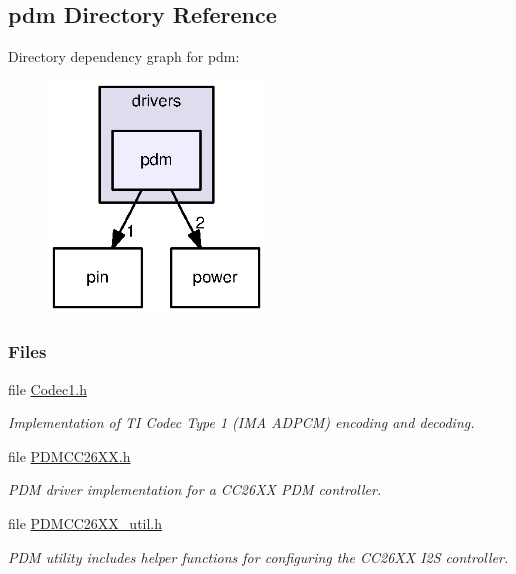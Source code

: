 \subsection{pdm Directory Reference}
\label{dir_bca3aac4d77a93238384b1b0950b79d9}
Directory dependency graph for pdm\+:
\nopagebreak
\begin{figure}[H]
\begin{center}
\leavevmode
\includegraphics[width=163pt]{dir_bca3aac4d77a93238384b1b0950b79d9_dep}
\end{center}
\end{figure}
\subsubsection*{Files}
\begin{DoxyCompactItemize}
\item 
file \hyperlink{_codec1_8h}{Codec1.\+h}
\begin{DoxyCompactList}\small\item\em Implementation of T\+I Codec Type 1 (I\+M\+A A\+D\+P\+C\+M) encoding and decoding. \end{DoxyCompactList}\item 
file \hyperlink{_p_d_m_c_c26_x_x_8h}{P\+D\+M\+C\+C26\+X\+X.\+h}
\begin{DoxyCompactList}\small\item\em P\+D\+M driver implementation for a C\+C26\+X\+X P\+D\+M controller. \end{DoxyCompactList}\item 
file \hyperlink{_p_d_m_c_c26_x_x__util_8h}{P\+D\+M\+C\+C26\+X\+X\+\_\+util.\+h}
\begin{DoxyCompactList}\small\item\em P\+D\+M utility includes helper functions for configuring the C\+C26\+X\+X I2\+S controller. \end{DoxyCompactList}\end{DoxyCompactItemize}
